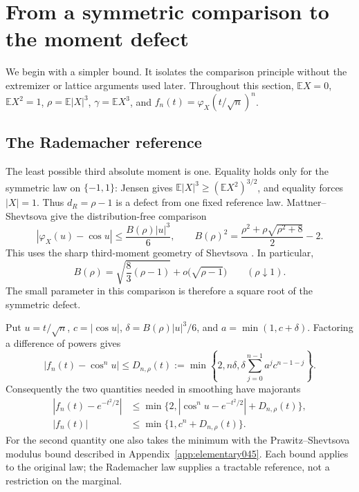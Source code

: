 \documentclass[11pt,a4paper]{article}
\numberwithin{equation}{section}
\theoremstyle{definition}
\theoremstyle{remark}
\newcommand{\E}{\mathbb E}
\begin{document}
\section{From a symmetric comparison to the moment defect}\label{opening:comparison}
We begin with a simpler bound. It isolates the comparison principle
without the extremizer or lattice arguments used later.
Throughout this section, \(\E X=0\), \(\E X^2=1\),
\(\rho=\E|X|^3\), \(\gamma=\E X^3\), and
\(f_n(t)=\varphi_X(t/\sqrt n)^n\).

\subsection{The Rademacher reference}
The least possible third absolute moment is one. Equality holds
only for the symmetric law on \(\{-1,1\}\): Jensen gives
\(\E|X|^3\ge(\E X^2)^{3/2}\), and equality forces \(|X|=1\).
Thus \(d_R=\rho-1\) is a defect from one fixed reference law.
Mattner--Shevtsova \cite[Theorem~1.2 and Example~1.4]{MattnerShevtsova2019}
give the distribution-free comparison
\begin{equation}\label{opening:rad}
 |\varphi_X(u)-\cos u|\le \frac{B(\rho)|u|^3}{6},\qquad
 B(\rho)^2=\frac{\rho^2+\rho\sqrt{\rho^2+8}}2-2.
\end{equation}
This uses the sharp third-moment geometry of Shevtsova
\cite[Theorem~6]{Shevtsova2014}. In particular,
\[
 B(\rho)=\sqrt{\frac83(\rho-1)}+o\bigl(\sqrt{\rho-1}\bigr)
 \qquad(\rho\downarrow1).
\]
The small parameter in this comparison is therefore a square root
of the symmetric defect.

Put \(u=t/\sqrt n\), \(c=|\cos u|\),
\(\delta=B(\rho)|u|^3/6\), and \(a=\min(1,c+\delta)\).
Factoring a difference of powers gives
\begin{equation}\label{opening:powers}
 |f_n(t)-\cos^n u|
 \le D_{n,\rho}(t):=
 \min\left\{2,n\delta,\delta\sum_{j=0}^{n-1}a^jc^{n-1-j}\right\}.
\end{equation}
Consequently the two quantities needed in smoothing have majorants
\[
 \begin{split}
 |f_n(t)-e^{-t^2/2}|&\le
 \min\{2,|\cos^n u-e^{-t^2/2}|+D_{n,\rho}(t)\},\\
 |f_n(t)|&\le \min\{1,c^n+D_{n,\rho}(t)\}.
 \end{split}
\]
For the second quantity one also takes the minimum with the
Prawitz--Shevtsova modulus bound described in
Appendix~\ref{app:elementary045}. Each bound applies to the original
law; the Rademacher law supplies a tractable reference, not a
restriction on the marginal.
\end{document}
